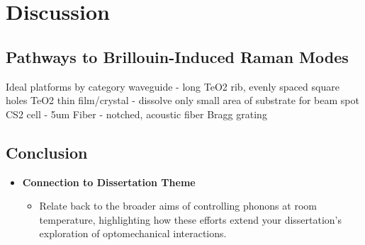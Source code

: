 
\section{Discussion}
\label{sec:Raman:Discussion}

\subsection{Pathways to Brillouin-Induced Raman Modes}
\label{subsec:Raman:Pathways}
Ideal platforms by category
  waveguide - long TeO2 rib, evenly spaced square holes
  TeO2 thin film/crystal - dissolve only small area of substrate for beam spot
  CS2 cell - 5um
  Fiber - notched, acoustic fiber Bragg grating

\subsection{Conclusion}
\label{subsec:Raman:Conclusion}

\begin{itemize}
\item \textbf{Connection to Dissertation Theme}
  \begin{itemize}
    \item Relate back to the broader aims of controlling phonons at room temperature, highlighting how these efforts extend your dissertation’s exploration of optomechanical interactions.
  \end{itemize}
\end{itemize}

\clearpage
\thispagestyle{empty}
\null
\newpage

